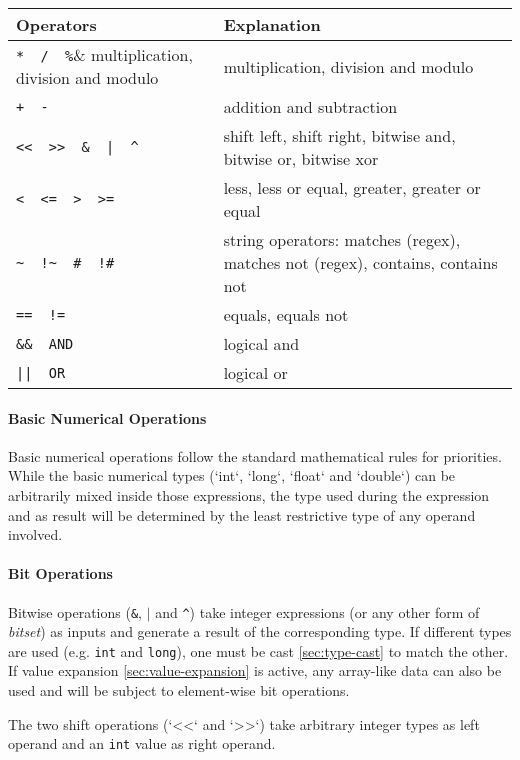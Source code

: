 \documentclass[11pt]{article}
\begin{document}
\noindent\begin{tabular}{|p{}|p{}|}
\hline 
Operators	& Explanation \\ 
\hline 
\hline
\verb|*  /  %|& multiplication, division and modulo \\ 
\hline 
\verb|+  -|& addition and subtraction \\ 
\hline 
\verb#<<  >>  &  |  ^#& shift left, shift right, bitwise and, bitwise or, bitwise xor \\ 
\hline 
\verb|<  <=  >  >=|& less, less or equal, greater, greater or equal \\ 
\hline 
\verb|~  !~  #  !#|& string operators: matches (regex), matches not (regex), contains, contains not \\ 
\hline 
\verb|==  !=|& equals, equals not \\ 
\hline 
\verb|&&  AND|& logical and \\ 
\hline 
\verb#||  OR#& logical or \\ 
\hline 
\end{tabular} 

\paragraph{Basic Numerical Operations}
\label{sec:basic-numerical-operations}

Basic numerical operations follow the standard mathematical rules for priorities.
While the basic numerical types (`int`, `long`, `float` and `double`) can be arbitrarily mixed inside those expressions, the type used during the expression and as result will be determined by the least restrictive type of any operand involved.

\paragraph{Bit Operations}
\label{sec:bit-operations}

Bitwise operations (\texttt{\&}, \texttt{$|$} and \texttt{\textasciicircum}) take integer expressions (or any other form of \textit{bitset}) as inputs and generate a result of the corresponding type. If different types are used (e.g. \texttt{int} and \texttt{long}), one must be cast \cref{sec:type-cast} to match the other. If value expansion \cref{sec:value-expansion} is active, any array-like data can also be used and will be subject to element-wise bit operations.

The two shift operations (`<<` and `>>`) take arbitrary integer types as left operand and an \texttt{int} value as right operand.
\end{document}
